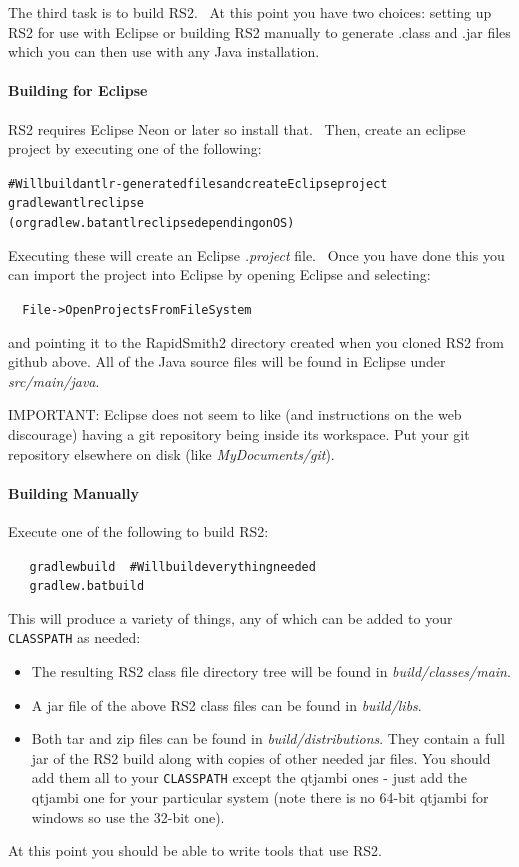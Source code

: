 \documentclass[12pt]{article}
\newcommand{\env}[1]{{\texttt{#1}}}
\newcommand{\fil}[1]{{\em #1}}
\newcommand{\dir}[1]{{\em #1}}
\newenvironment{code}{\begin{center} \begin{minipage}{6in} \noindent \begin{alltt}}{\end{alltt} \end{minipage} \end{center}}
\begin{document}
The third task is to build RS2.  At this point you have two choices: setting up
RS2 for use with Eclipse or building RS2 manually to generate
.class and .jar files which you can then use with any Java installation.
	
\paragraph{Building for Eclipse}  
RS2 requires Eclipse Neon or later so install that. 
Then, create an eclipse project by executing one of the following:

\vspace{-0.15in}  \begin{code}
# Will build antlr-generated files and create Eclipse project
gradlew antlr eclipse       
(or gradlew.bat antlr eclipse depending on OS)
\end{code} 
Executing these will create an Eclipse \fil{.project} file.  Once you have done
this you can import the project into Eclipse by opening Eclipse and selecting: 
\vspace{-0.15in}  \begin{code}
    File->Open Projects From File System 
\end{code}
and pointing it to the RapidSmith2 directory created when you cloned RS2 from
github above. 
All of the Java source files will be found in Eclipse under \dir{src/main/java}.

IMPORTANT: Eclipse does not seem to like (and instructions on the web
discourage) having a git repository being inside its workspace.  Put your git
repository elsewhere on disk (like \dir{MyDocuments/git}).

\paragraph{Building Manually} 
Execute one of the following to build RS2: 
\vspace{-0.15in}  \begin{code}
     gradlew build     # Will build everything needed
     gradlew.bat build 
\end{code}
This will produce a variety of things, any of which can be added to your
\env{CLASSPATH} as needed:
\begin{itemize}
  \item The resulting RS2 class file directory tree will be found in
  \dir{build/classes/main}.
  \item	A jar file of the above RS2 class files can be
  found in \dir{build/libs}.
  \item Both tar and zip files can be found in \dir{build/distributions}. They
  contain a full jar of the RS2 build along with copies of other needed jar
  files. You should add them all to your \env{CLASSPATH} except the qtjambi ones
  - just add the qtjambi one for your particular system (note there is no 64-bit
  qtjambi for windows so use the 32-bit one).
\end{itemize}
At this point you should be able to write tools that use RS2.
\end{document}
